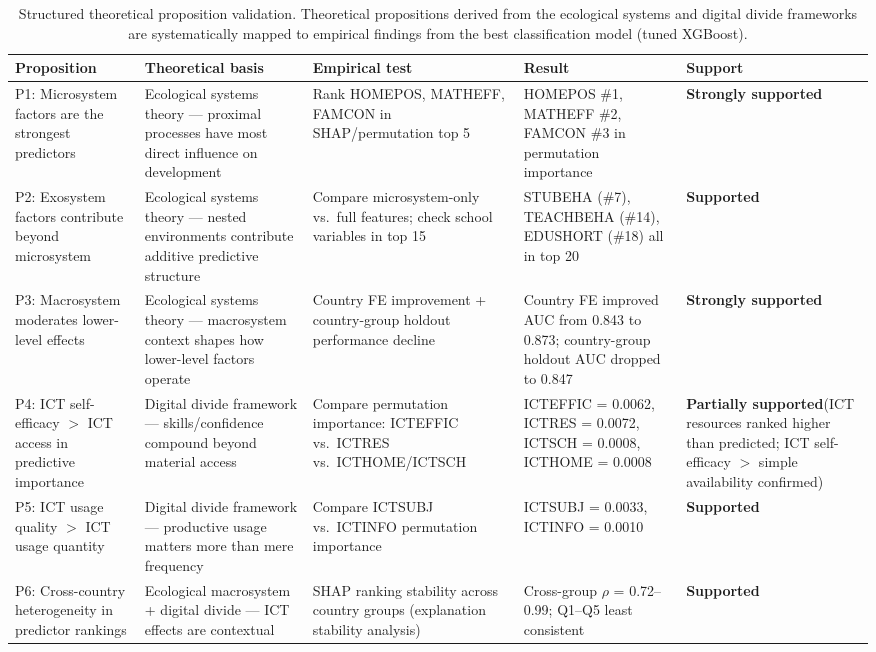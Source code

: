 \begin{table}[tb]
\centering
\caption{Structured theoretical proposition validation. Theoretical propositions derived from the ecological systems and digital divide frameworks are systematically mapped to empirical findings from the best classification model (tuned XGBoost).}
\label{tab:theoretical-propositions}
\begin{tabular}{lp{2.8cm}p{2.8cm}p{3.5cm}l}
\toprule
Proposition & Theoretical basis & Empirical test & Result & Support \\
\midrule
P1: Microsystem factors are the strongest predictors & Ecological systems theory --- proximal processes have most direct influence on development & Rank HOMEPOS, MATHEFF, FAMCON in SHAP/permutation top 5 & HOMEPOS \#1, MATHEFF \#2, FAMCON \#3 in permutation importance & \textbf{Strongly supported} \\
\midrule
P2: Exosystem factors contribute beyond microsystem & Ecological systems theory --- nested environments contribute additive predictive structure & Compare microsystem-only vs.\ full features; check school variables in top 15 & STUBEHA (\#7), TEACHBEHA (\#14), EDUSHORT (\#18) all in top 20 & \textbf{Supported} \\
\midrule
P3: Macrosystem moderates lower-level effects & Ecological systems theory --- macrosystem context shapes how lower-level factors operate & Country FE improvement + country-group holdout performance decline & Country FE improved AUC from 0.843 to 0.873; country-group holdout AUC dropped to 0.847 & \textbf{Strongly supported} \\
\midrule
P4: ICT self-efficacy $>$ ICT access in predictive importance & Digital divide framework --- skills/confidence compound beyond material access & Compare permutation importance: ICTEFFIC vs.\ ICTRES vs.\ ICTHOME/ICTSCH & ICTEFFIC = 0.0062, ICTRES = 0.0072, ICTSCH = 0.0008, ICTHOME = 0.0008 & \textbf{Partially supported}\newline (ICT resources ranked higher than predicted; ICT self-efficacy $>$ simple availability confirmed) \\
\midrule
P5: ICT usage quality $>$ ICT usage quantity & Digital divide framework --- productive usage matters more than mere frequency & Compare ICTSUBJ vs.\ ICTINFO permutation importance & ICTSUBJ = 0.0033, ICTINFO = 0.0010 & \textbf{Supported} \\
\midrule
P6: Cross-country heterogeneity in predictor rankings & Ecological macrosystem + digital divide --- ICT effects are contextual & SHAP ranking stability across country groups (explanation stability analysis) & Cross-group $\rho$ = 0.72--0.99; Q1--Q5 least consistent & \textbf{Supported} \\
\bottomrule
\end{tabular}


\end{table}
